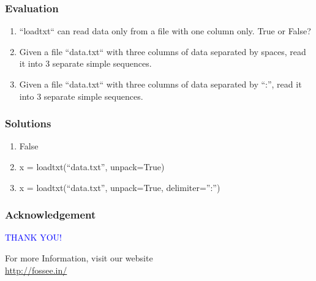 \documentclass[presentation]{beamer}
\begin{document}
\begin{frame}
\frametitle{Evaluation}
\label{sec-5}


\begin{enumerate}
\item ``loadtxt`` can read data only from a file with one column only.
     True or False?
\item Given a file ``data.txt`` with three columns of data separated by
     spaces, read it into 3 separate simple sequences.
\item Given a file ``data.txt`` with three columns of data separated by
     ``:'', read it into 3 separate simple sequences.
\end{enumerate}
  
\end{frame}
\begin{frame}
\frametitle{Solutions}
\label{sec-6}


\begin{enumerate}
\item False
\item x = loadtxt(``data.txt'', unpack=True)
\item x = loadtxt(``data.txt'', unpack=True, delimiter='':'')
\end{enumerate}
\end{frame}
\begin{frame}
\frametitle{Acknowledgement}
\label{sec-7}

   \begin{block}{}
  \begin{center}
  \textcolor{blue}{\Large THANK YOU!} 
  \end{center}
  \end{block}
\begin{block}{}
  \begin{center}
    For more Information, visit our website\\
    \url{http://fossee.in/}
  \end{center}  
  \end{block}
\end{frame}
\end{document}
